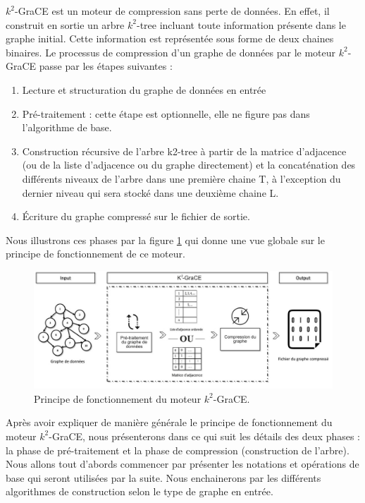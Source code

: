 \documentclass[a4paper,oneside,12pt]{report}
\theoremstyle{definition}
\begin{document}
	
$k^2$-GraCE est un moteur de compression sans perte de données. En effet, il construit en sortie un arbre $k^2$-tree incluant toute information présente dans le graphe initial. Cette information est représentée sous forme de deux chaines binaires. Le processus de compression d'un graphe de données par le moteur $k^2$-GraCE passe par les étapes suivantes :
\begin{enumerate}
\item Lecture et structuration du graphe de données en entrée 
\item Pré-traitement : cette étape est optionnelle, elle ne figure pas dans l'algorithme de base. 
\item Construction récursive de l'arbre k2-tree à partir de la matrice d'adjacence (ou de la liste d'adjacence ou du graphe directement) et la concaténation des différents niveaux de l'arbre dans une première chaine T, à l'exception du dernier niveau qui sera stocké dans une deuxième chaine L.

\item Écriture du graphe compressé sur le fichier de sortie.
\end{enumerate}

Nous illustrons ces phases par la figure \ref{k2grace} qui donne une vue globale sur le principe de fonctionnement de ce moteur.


\begin{figure}[H]
\includegraphics[scale=0.48]{./ressources/image/ograce.jpg}
\caption[Principe de fonctionnement du moteur $k^2$-GraCE]{Principe de fonctionnement du moteur $k^2$-GraCE.}
			\label{k2grace}
\end{figure}
Après avoir expliquer de manière générale le principe de fonctionnement du moteur $k^2$-GraCE, nous présenterons dans ce qui suit les détails des deux phases : la phase de pré-traitement et la phase de compression (construction de l'arbre). Nous allons tout d'abords commencer par présenter les notations et opérations de base qui seront utilisées par la suite. Nous enchainerons par les différents algorithmes de construction selon le type de graphe en entrée.
		
\end{document}
